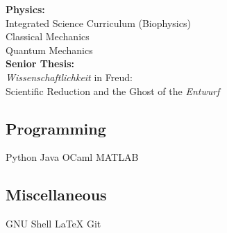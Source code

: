 \documentclass[a4paper]{MagicalCV}
\begin{document}
\begin{minipage}[t]{0.33\textwidth}
\textbf{Physics:} \\
Integrated Science Curriculum (Biophysics) \\
Classical Mechanics \\
Quantum Mechanics \\

\textbf{Senior Thesis:} \\
\textit{Wissenschaftlichkeit} in Freud: \\
Scientific Reduction and the Ghost of the \textit{Entwurf}
\sectionsep


\subsection{Programming}
Python \textbullet{} Java \textbullet{} OCaml \textbullet{} MATLAB
\sectionsep


\subsection{Miscellaneous}
GNU \textbullet{} Shell \textbullet{} \LaTeX \textbullet{} Git
\sectionsep

\end{minipage} 
\hfill
\end{document}
